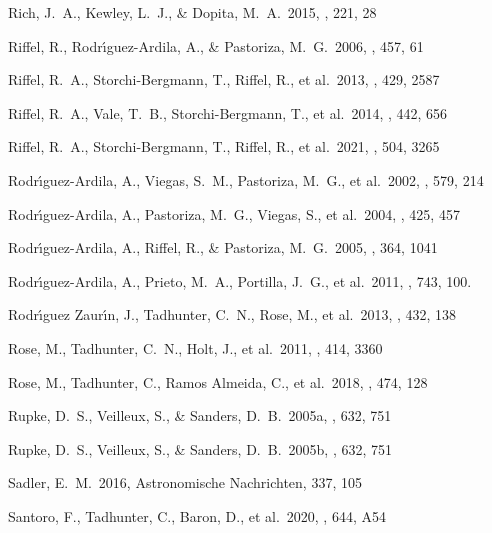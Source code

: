 \documentclass{aa}
\begin{document}
\begin{thebibliography}
 Rich, J.~A., Kewley, L.~J., \& Dopita, M.~A.\ 2015, \apjs, 221, 28

 Riffel, R., Rodr{\'\i}guez-Ardila, A., \& Pastoriza, M.~G.\ 2006, \aap, 457, 61

 Riffel, R.~A., Storchi-Bergmann, T., Riffel, R., et al.\ 2013, \mnras, 429, 2587

 Riffel, R.~A., Vale, T.~B., Storchi-Bergmann, T., et al.\ 2014, \mnras, 442, 656

 Riffel, R.~A., Storchi-Bergmann, T., Riffel, R., et al.\ 2021, \mnras, 504, 3265

 Rodr{\'\i}guez-Ardila, A., Viegas, S.~M., Pastoriza, M.~G., et al.\ 2002, \apj, 579, 214

 Rodr{\'\i}guez-Ardila, A., Pastoriza, M.~G., Viegas, S., et al.\ 2004, \aap, 425, 457

 Rodr{\'\i}guez-Ardila, A., Riffel, R., \& Pastoriza, M.~G.\ 2005, \mnras, 364, 1041

 Rodr{\'\i}guez-Ardila, A., Prieto, M.~A., Portilla, J.~G., et al.\ 2011, \apj, 743, 100.


 Rodr{\'\i}guez Zaur{\'\i}n, J., Tadhunter, C.~N., Rose, M., et al.\ 2013, \mnras, 432, 138

 Rose, M., Tadhunter, C.~N., Holt, J., et al.\ 2011, \mnras, 414, 3360

 Rose, M., Tadhunter, C., Ramos Almeida, C., et al.\ 2018, \mnras, 474, 128

 Rupke, D.~S., Veilleux, S., \& Sanders, D.~B.\ 2005a, \apj, 632, 751


 Rupke, D.~S., Veilleux, S., \& Sanders, D.~B.\ 2005b, \apjs, 632, 751



 Sadler, E.~M.\ 2016, Astronomische Nachrichten, 337, 105

 Santoro, F., Tadhunter, C., Baron, D., et al.\ 2020, \aap, 644, A54


\end{thebibliography}
\end{document}
